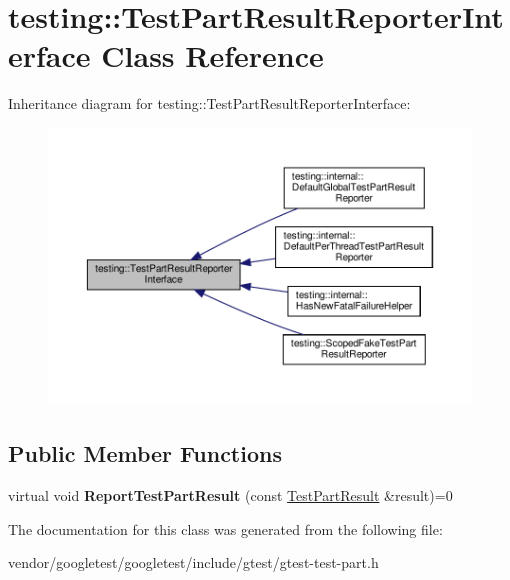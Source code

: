 \hypertarget{classtesting_1_1_test_part_result_reporter_interface}{}\section{testing\+:\+:Test\+Part\+Result\+Reporter\+Interface Class Reference}
\label{classtesting_1_1_test_part_result_reporter_interface}


Inheritance diagram for testing\+:\+:Test\+Part\+Result\+Reporter\+Interface\+:
\nopagebreak
\begin{figure}[H]
\begin{center}
\leavevmode
\includegraphics[width=350pt]{classtesting_1_1_test_part_result_reporter_interface__inherit__graph}
\end{center}
\end{figure}
\subsection*{Public Member Functions}
\begin{DoxyCompactItemize}
\item 
\mbox{\label{classtesting_1_1_test_part_result_reporter_interface_aa2f920e7a5a0a6d0faf19e3727928c22}} 
virtual void {\bfseries Report\+Test\+Part\+Result} (const \hyperlink{classtesting_1_1_test_part_result}{Test\+Part\+Result} \&result)=0
\end{DoxyCompactItemize}


The documentation for this class was generated from the following file\+:\begin{DoxyCompactItemize}
\item 
vendor/googletest/googletest/include/gtest/gtest-\/test-\/part.\+h\end{DoxyCompactItemize}
